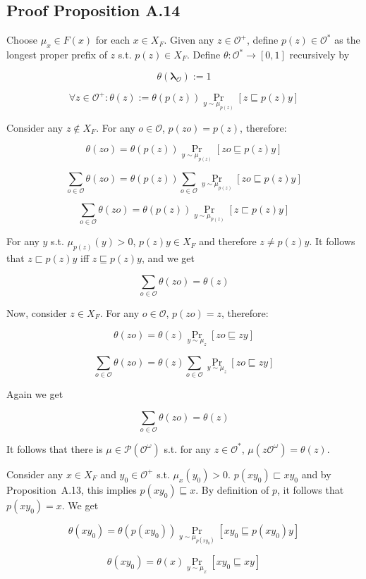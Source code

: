 \documentclass[a4paper]{article}
\DeclareMathOperator{\Prb}{Pr}
\newcommand{\Estr}{\bm{\lambda}}
\newcommand{\Prob}{\mathcal{P}}
\newcommand{\Obs}{\mathcal{O}}
\newcommand{\ObsO}{\Obs^\omega}
\begin{document}
\subsection{Proof Proposition A.14}

Choose ${\mu_x \in F(x)}$ for each ${x \in X_F}$. Given any ${z \in \Obs^+}$, define ${p(z) \in \Obs^*}$ as the longest proper prefix of ${z}$ s.t. ${p(z) \in X_F}$. Define ${\theta: \Obs^* \rightarrow [0,1]}$ recursively by

$$\theta(\Estr_\Obs):=1$$

$$\forall z \in \Obs^+: \theta(z):=\theta(p(z)) \Prb_{y \sim \mu_{p(z)}}[z \sqsubseteq p(z)y]$$

Consider any ${z \not\in X_F}$. For any ${o \in \Obs}$, ${p(zo)=p(z)}$, therefore:

$$\theta(zo)=\theta(p(z))\Prb_{y \sim \mu_{p(z)}}[zo \sqsubseteq p(z)y]$$

$$\sum_{o \in \Obs} \theta(zo)=\theta(p(z)) \sum_{o \in \Obs} \Prb_{y \sim \mu_{p(z)}}[zo \sqsubseteq p(z)y]$$

$$\sum_{o \in \Obs} \theta(zo)=\theta(p(z)) \Prb_{y \sim \mu_{p(z)}}[z \sqsubset p(z)y]$$

For any ${y}$ s.t. ${\mu_{p(z)}(y) > 0}$, ${p(z)y \in X_F}$ and therefore ${z \ne p(z)y}$. It follows that ${z \sqsubset p(z)y}$ iff ${z \sqsubseteq p(z)y}$, and we get

$$\sum_{o \in \Obs} \theta(zo)=\theta(z)$$

Now, consider ${z \in X_F}$. For any ${o \in \Obs}$, ${p(zo)=z}$, therefore:

$$\theta(zo)=\theta(z)\Prb_{y \sim \mu_z}[zo \sqsubseteq zy]$$

$$\sum_{o \in \Obs} \theta(zo)=\theta(z) \sum_{o \in \Obs} \Prb_{y \sim \mu_z}[zo \sqsubseteq zy]$$

Again we get 

$$\sum_{o \in \Obs} \theta(zo)=\theta(z)$$

It follows that there is ${\mu \in \Prob(\ObsO)}$ s.t. for any ${z \in \Obs^*}$, ${\mu(z\ObsO)=\theta(z)}$.

Consider any ${x \in X_F}$ and ${y_0 \in \Obs^+}$ s.t. ${\mu_x(y_0) > 0}$. ${p(xy_0) \sqsubset xy_0}$ and by Proposition\ A.13, this implies ${p(xy_0) \sqsubseteq x}$. By definition of ${p}$, it follows that ${p(xy_0)=x}$. We get

$$\theta(xy_0)=\theta(p(xy_0)) \Prb_{y \sim \mu_{p(xy_0)}}[xy_0 \sqsubseteq p(xy_0)y]$$

$$\theta(xy_0)=\theta(x) \Prb_{y \sim \mu_x}[xy_0 \sqsubseteq xy]$$
\end{document}
